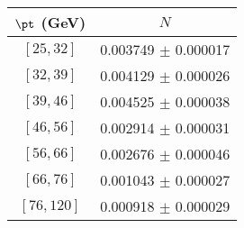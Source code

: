 \begin{tabular}{c||c}
$\pt$ (GeV) & $N$  \\
\hline
$[25, 32]$ & 0.003749 $\pm$ 0.000017\\
$[32, 39]$ & 0.004129 $\pm$ 0.000026\\
$[39, 46]$ & 0.004525 $\pm$ 0.000038\\
$[46, 56]$ & 0.002914 $\pm$ 0.000031\\
$[56, 66]$ & 0.002676 $\pm$ 0.000046\\
$[66, 76]$ & 0.001043 $\pm$ 0.000027\\
$[76, 120]$ & 0.000918 $\pm$ 0.000029\\
\end{tabular}
